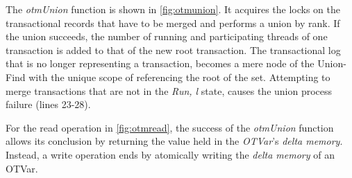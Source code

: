 The \emph{otmUnion} function is shown in \cref{fig:otmunion}. It acquires the locks on the transactional records that have to be merged and performs a union by rank. If the union succeeds, the number of running and participating threads of one transaction is added to that of the new root transaction. The transactional log that is no longer representing a transaction, becomes a mere node of the Union-Find with the unique scope of referencing the root of the set. Attempting to merge transactions that are not in the \emph{Ru\textlangle n, l\textrangle} state, causes the union process failure (lines 23-28).

For the read operation in \cref{fig:otmread}, the success of the \emph{otmUnion} function allows its conclusion by returning the value held in the \emph{OTVar}'s \emph{delta memory}. Instead, a write operation ends by atomically writing the \emph{delta memory} of an OTVar.
